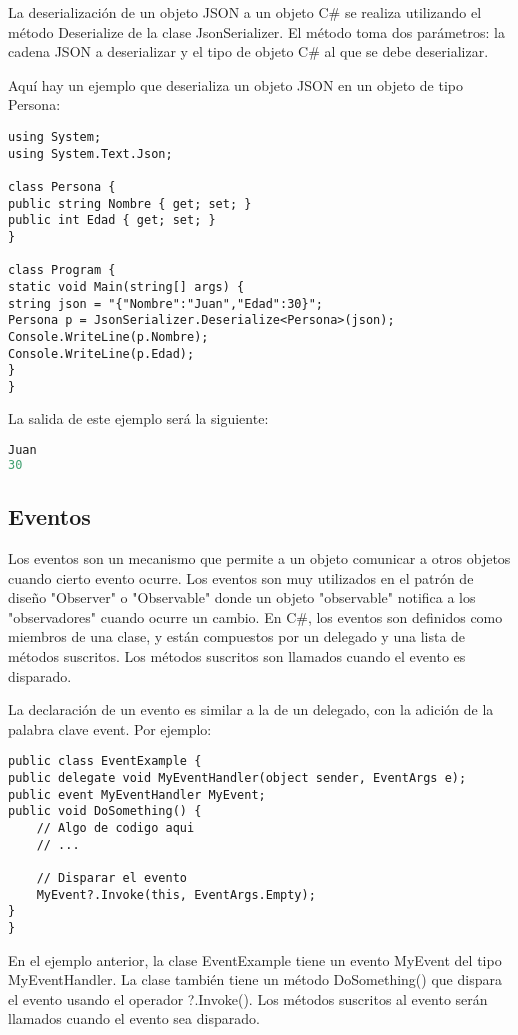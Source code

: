 \documentclass[executivepaper]{article}
\begin{document}
La deserialización de un objeto JSON a un objeto C\# se realiza utilizando el método Deserialize de la clase JsonSerializer. El método toma dos parámetros: la cadena JSON a deserializar y el tipo de objeto C\# al que se debe deserializar.

Aquí hay un ejemplo que deserializa un objeto JSON en un objeto de tipo Persona:

\begin{lstlisting}
using System;
using System.Text.Json;

class Persona {
public string Nombre { get; set; }
public int Edad { get; set; }
}

class Program {
static void Main(string[] args) {
string json = "{"Nombre":"Juan","Edad":30}";
Persona p = JsonSerializer.Deserialize<Persona>(json);
Console.WriteLine(p.Nombre);
Console.WriteLine(p.Edad);
}
}
\end{lstlisting}

La salida de este ejemplo será la siguiente:

\begin{lstlisting}[language=python]
Juan
30
\end{lstlisting}

\subsection{Eventos}

Los eventos son un mecanismo que permite a un objeto comunicar a otros objetos cuando cierto evento ocurre. Los eventos son muy utilizados en el patrón de diseño "Observer" o "Observable" donde un objeto "observable" notifica a los "observadores" cuando ocurre un cambio. En C\#, los eventos son definidos como miembros de una clase, y están compuestos por un delegado y una lista de métodos suscritos. Los métodos suscritos son llamados cuando el evento es disparado.

La declaración de un evento es similar a la de un delegado, con la adición de la palabra clave event. Por ejemplo:

\begin{lstlisting}
public class EventExample {
public delegate void MyEventHandler(object sender, EventArgs e);
public event MyEventHandler MyEvent;
public void DoSomething() {
    // Algo de codigo aqui
    // ...

    // Disparar el evento
    MyEvent?.Invoke(this, EventArgs.Empty);
}
}
\end{lstlisting}

En el ejemplo anterior, la clase EventExample tiene un evento MyEvent del tipo MyEventHandler. La clase también tiene un método DoSomething() que dispara el evento usando el operador ?.Invoke(). Los métodos suscritos al evento serán llamados cuando el evento sea disparado.
\end{document}
